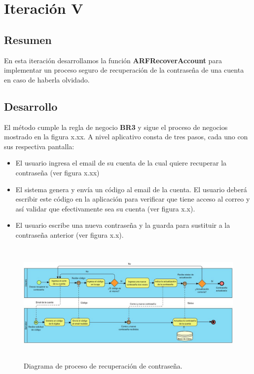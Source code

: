 \section{Iteración V}
\subsection{Resumen}
En esta iteración desarrollamos la función \textbf{ARFRecoverAccount} para implementar un proceso seguro de recuperación de la contraseña de una cuenta en caso de haberla olvidado.

\subsection{Desarrollo}
El método cumple la regla de negocio \textbf{BR3} y sigue el proceso de negocios mostrado en la figura x.xx. A nivel aplicativo consta de tres pasos, cada uno con sus respectiva pantalla:
\begin{itemize}
	\item El usuario ingresa el email de su cuenta de la cual quiere recuperar la contraseña (ver figura x.xx)
	\item El sistema genera y envía un código al email de la cuenta. El usuario deberá escribir este código en la aplicación para verificar que tiene acceso al correo y así validar que efectivamente sea su cuenta (ver figura x.x).
	\item El usuario escribe una nueva contraseña y la guarda para sustituir a la contraseña anterior (ver figura x.x).
\end{itemize}
\begin{figure}[h!]
	\centering
	\includegraphics[width=15cm,height=6cm]{imagenes/desarrollo/diagramas/BPMN_RECOVER.jpg}
	\caption{Diagrama de proceso de recuperación de contraseña.}
	\label{fig:recover}
\end{figure}
\clearpage
